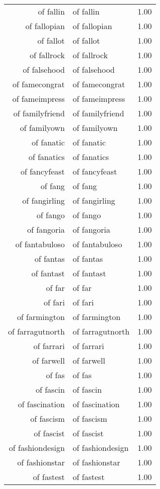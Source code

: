 \begin{table}[ht]
\begin{tabular}{rlr}
  of fallin & of fallin & 1.00 \\ 
  of fallopian & of fallopian & 1.00 \\ 
  of fallot & of fallot & 1.00 \\ 
  of fallrock & of fallrock & 1.00 \\ 
  of falsehood & of falsehood & 1.00 \\ 
  of famecongrat & of famecongrat & 1.00 \\ 
  of fameimpress & of fameimpress & 1.00 \\ 
  of familyfriend & of familyfriend & 1.00 \\ 
  of familyown & of familyown & 1.00 \\ 
  of fanatic & of fanatic & 1.00 \\ 
  of fanatics & of fanatics & 1.00 \\ 
  of fancyfeast & of fancyfeast & 1.00 \\ 
  of fang & of fang & 1.00 \\ 
  of fangirling & of fangirling & 1.00 \\ 
  of fango & of fango & 1.00 \\ 
  of fangoria & of fangoria & 1.00 \\ 
  of fantabuloso & of fantabuloso & 1.00 \\ 
  of fantas & of fantas & 1.00 \\ 
  of fantast & of fantast & 1.00 \\ 
  of far & of far & 1.00 \\ 
  of fari & of fari & 1.00 \\ 
  of farmington & of farmington & 1.00 \\ 
  of farragutnorth & of farragutnorth & 1.00 \\ 
  of farrari & of farrari & 1.00 \\ 
  of farwell & of farwell & 1.00 \\ 
  of fas & of fas & 1.00 \\ 
  of fascin & of fascin & 1.00 \\ 
  of fascination & of fascination & 1.00 \\ 
  of fascism & of fascism & 1.00 \\ 
  of fascist & of fascist & 1.00 \\ 
  of fashiondesign & of fashiondesign & 1.00 \\ 
  of fashionstar & of fashionstar & 1.00 \\ 
  of fastest & of fastest & 1.00 \\ 

\end{tabular}
\end{table}
